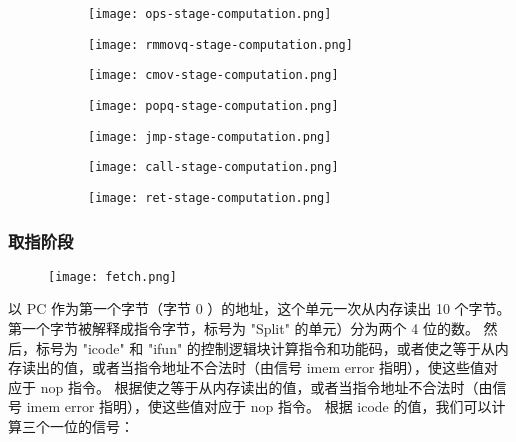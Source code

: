 \begin{figure}[H]
    \centering
    \begin{subfigure}[t]{0.5\textwidth}
        \centering
        \texttt{[image: ops-stage-computation.png]}
    \end{subfigure}\hfill
    \begin{subfigure}[t]{0.5\textwidth}
        \centering
        \texttt{[image: rmmovq-stage-computation.png]}
    \end{subfigure}
    \medskip
    \begin{subfigure}[t]{0.5\textwidth}
        \centering
        \texttt{[image: cmov-stage-computation.png]}
    \end{subfigure}\hfill
    \begin{subfigure}[t]{0.5\textwidth}
        \centering
        \texttt{[image: popq-stage-computation.png]}
    \end{subfigure}
    \medskip
    \begin{subfigure}[t]{0.5\textwidth}
        \centering
        \texttt{[image: jmp-stage-computation.png]}
    \end{subfigure}\hfill
    \begin{subfigure}[t]{0.5\textwidth}
        \centering
        \texttt{[image: call-stage-computation.png]}
    \end{subfigure}
    \medskip
    \begin{subfigure}[t]{0.5\textwidth}
        \centering
        \texttt{[image: ret-stage-computation.png]}
    \end{subfigure}
\end{figure}

\subsubsection{取指阶段}

\begin{figure}[H]
    \centering
    \texttt{[image: fetch.png]}
\end{figure}

以 PC 作为第一个字节（字节 0 ）的地址，这个单元一次从内存读出 10 个字节。
第一个字节被解释成指令字节，标号为 "Split" 的单元）分为两个 4 位的数。
然后，标号为 "icode" 和 "ifun" 的控制逻辑块计算指令和功能码，或者使之等于从内存读出的值，或者当指令地址不合法时（由信号 imem error 指明），使这些值对应于 nop 指令。
根据使之等于从内存读出的值，或者当指令地址不合法时（由信号 imem error 指明），使这些值对应于 nop 指令。
根据 icode 的值，我们可以计算三个一位的信号：

